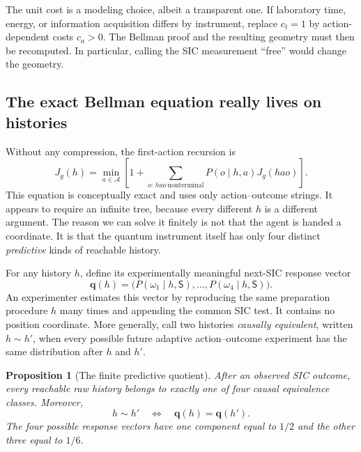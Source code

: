 \documentclass[11pt]{article}
\newtheorem{proposition}[theorem]{Proposition}
\theoremstyle{definition}
\theoremstyle{remark}
\begin{document}
The unit cost is a modeling choice, albeit a transparent one. If laboratory
time, energy, or information acquisition differs by instrument, replace
\(c_t=1\) by action-dependent costs \(c_a>0\). The Bellman proof and the
resulting geometry must then be recomputed. In particular, calling the SIC
measurement ``free'' would change the geometry.

\subsection{The exact Bellman equation really lives on histories}

Without any compression, the first-action recursion is
\[
 J_g(h)=\min_{a\in\mathcal A}\left[
  1+\sum_{o:\,hao\ \mathrm{nonterminal}}
 P(o\mid h,a)J_g(hao)
 \right].
\]
This equation is conceptually exact and uses only action--outcome strings.
It appears to require an infinite tree, because every different \(h\) is a
different argument.  The reason we can solve it finitely is not that the
agent is handed a coordinate.  It is that the quantum instrument itself has
only four distinct \emph{predictive} kinds of reachable history.

For any history \(h\), define its experimentally meaningful next-SIC response
vector
\[
 \bm q(h)=\big(P(\omega_1\mid h,\mathsf S),\ldots,
 P(\omega_4\mid h,\mathsf S)\big).
\]
An experimenter estimates this vector by reproducing the same preparation
procedure \(h\) many times and appending the common SIC test.  It contains no
position coordinate.  More generally, call two histories \emph{causally
equivalent}, written \(h\sim h'\), when every possible future adaptive
action--outcome experiment has the same distribution after \(h\) and \(h'\).

\begin{proposition}[The finite predictive quotient]
\label{prop:predictive-quotient}
After an observed SIC outcome, every reachable raw history belongs to exactly
one of four causal equivalence classes.  Moreover,
\[
 h\sim h'\quad\Longleftrightarrow\quad \bm q(h)=\bm q(h').
\]
The four possible response vectors have one component equal to \(1/2\) and
the other three equal to \(1/6\).
\end{proposition}
\end{document}
